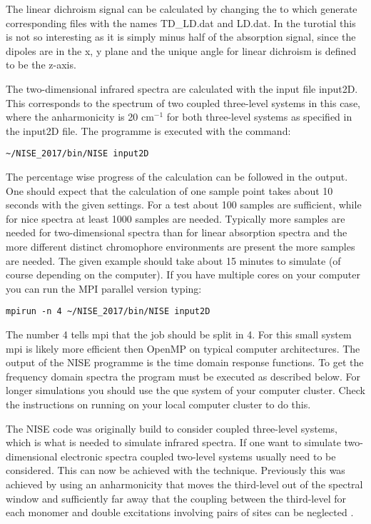 The linear dichroism signal can be calculated by changing the  to  which generate corresponding files with the names TD\_LD.dat and LD.dat. In the turotial this is 
not so interesting as it is simply minus half of the absorption signal, since the dipoles are in the 
x, y plane and the unique angle for linear dichroism is defined to be the z-axis.

The two-dimensional infrared spectra are calculated with the input file input2D. This corresponds to the spectrum of two coupled three-level systems in this case, where the anharmonicity is 20 cm$^{-1}$ for both three-level systems as specified in the input2D file. The programme is executed with the command:
\begin{lstlisting}[style=mystyle]
~/NISE_2017/bin/NISE input2D
\end{lstlisting}
The percentage wise progress of the calculation can be followed in the output. One should expect that the calculation of one sample point takes about 10 seconds with the given settings. For a test about 100 samples are sufficient, while for nice spectra at least 1000 samples are needed. Typically more samples are needed for two-dimensional spectra than for linear absorption spectra and the more different distinct chromophore environments are present the more samples are needed. The given example should take about 15 minutes to simulate (of course depending on the computer).
If you have multiple cores on your computer you can run the MPI parallel version typing:
\begin{lstlisting}[style=mystyle]
mpirun -n 4 ~/NISE_2017/bin/NISE input2D
\end{lstlisting}
The number 4 tells mpi that the job should be split in 4. For this small system mpi is likely more efficient then OpenMP on typical computer architectures. The output of the NISE programme is the time domain response functions. To get the frequency domain spectra the  program must be executed as described below. For longer simulations you should use the que system of your computer cluster. Check the instructions on running on your local computer cluster to do this.

The NISE code was originally build to consider coupled three-level systems, which is what is needed to simulate infrared spectra. If one want to simulate two-dimensional electronic spectra coupled two-level systems usually need to be considered. This can now be achieved with the  technique. Previously this was achieved by using an anharmonicity that moves the third-level out of the spectral window and sufficiently far away that the coupling between the third-level for each monomer and double excitations involving pairs of sites can be neglected \cite{Olbrich.2011.JPCB.115.8609,Liang.2012.JCTC.8.1706}. 

